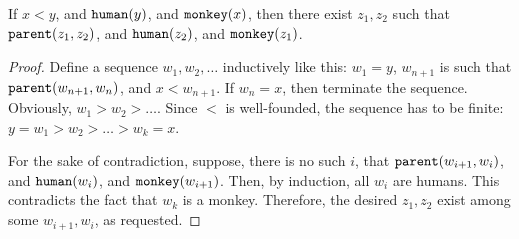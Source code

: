 \begin{theorem}
    If $x < y$, and ${\tt human}(y)$, and ${\tt monkey}(x)$, then there exist $z_1, z_2$ such that ${\tt parent}(z_1, z_2)$, and ${\tt human}(z_2)$, and ${\tt monkey}(z_1)$.
\end{theorem}
\begin{proof}
    Define a sequence $w_1, w_2, \ldots$ inductively like this: $w_1 = y$, $w_{n+1}$ is such that ${\tt parent}(w_{n+1}, w_n)$, and $x < w_{n+1}$. If $w_n = x$, then terminate the sequence. Obviously, $w_1 > w_2 > \ldots$. Since $<$ is well-founded, the sequence has to be finite: $y = w_1 > w_2 > \ldots > w_k = x$.

    For the sake of contradiction, suppose, there is no such $i$, that ${\tt parent}(w_{i+1}, w_i)$, and ${\tt human}(w_{i})$, and ${\tt monkey}(w_{i+1})$. Then, by induction, all $w_i$ are humans. This contradicts the fact that $w_k$ is a monkey. Therefore, the desired $z_1, z_2$ exist among some $w_{i+1}, w_i$, as requested.
\end{proof}


